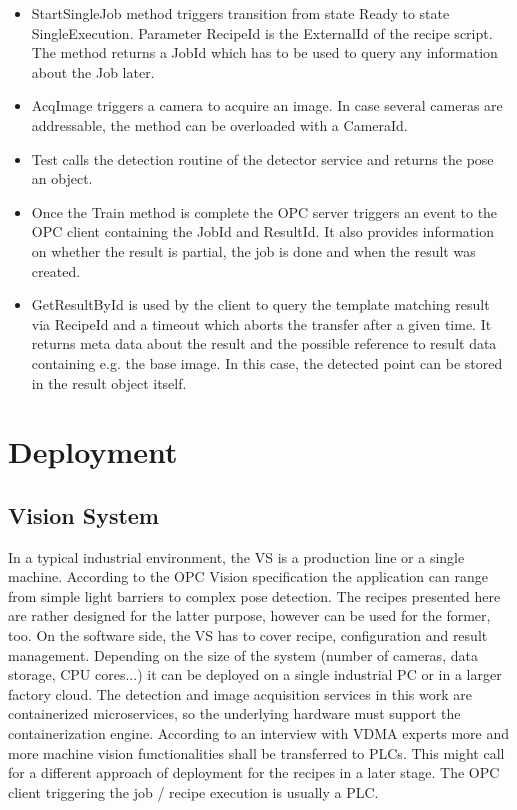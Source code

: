 \begin{itemize}
\begin{itemize}
    	\item StartSingleJob method triggers transition from state Ready to state SingleExecution. Parameter RecipeId is the ExternalId of the recipe script. The method returns a JobId which has to be used to query any information about the Job later.
    	\item AcqImage triggers a camera to acquire an image. In case several cameras are addressable, the method can be overloaded with a CameraId.
    	\item Test calls the detection routine of the detector service and returns the pose an object.
    	\item Once the Train method is complete the OPC server triggers an event to the OPC client containing the JobId and ResultId. It also provides information on whether the result is partial, the job is done and when the result was created.
    	\item GetResultById is used by the client to query the template matching result via RecipeId and a timeout which aborts the transfer after a given time. It returns meta data about the result and the possible reference to result data containing e.g. the base image. In this case, the detected point can be stored in the result object itself.
    \end{itemize}
\end{itemize}

\section{Deployment}
\subsection{Vision System}
In a typical industrial environment, the VS is a production line or a single machine. According to the OPC Vision specification the application can range from simple light barriers to complex pose detection. The recipes presented here are rather designed for the latter purpose, however can be used for the former, too. On the software side, the VS has to cover recipe, configuration and result management. Depending on the size of the system (number of cameras, data storage, CPU cores...) it can be deployed on a single industrial PC or in a larger factory cloud. The detection and image acquisition services in this work are containerized microservices, so the underlying hardware must support the containerization engine. According to an interview with VDMA experts \cite{Lastvisited26-04-20192015OPCVision} more and more machine vision functionalities shall be transferred to PLCs. This might call for a different approach of deployment for the recipes in a later stage. The OPC client triggering the job / recipe execution is usually a PLC.\\

